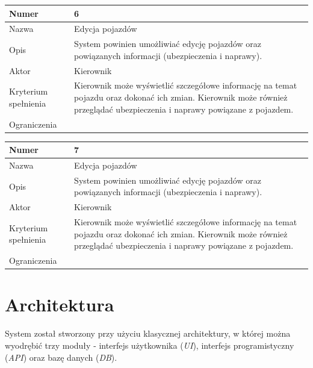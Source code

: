 \documentclass[eng,printmode,openany]{mgr}
\begin{document}
	\begin{table}[H]
		\begin{tabularx}{\textwidth}{|l|X|}
			\hline
			Numer                & 6  \\ \hline
			Nazwa                & Edycja pojazdów \\ \hline
			Opis                 & System powinien umożliwiać edycję pojazdów oraz powiązanych informacji (ubezpieczenia i naprawy). \\ \hline
			Aktor                & Kierownik \\ \hline
			Kryterium spełnienia & Kierownik może wyświetlić szczegółowe informację na temat pojazdu oraz dokonać ich zmian. Kierownik może również przeglądać ubezpieczenia i naprawy powiązane z pojazdem. \\ \hline
			Ograniczenia         &  \\ \hline
		\end{tabularx}
	\end{table}	

	\begin{table}[H]
		\begin{tabularx}{\textwidth}{|l|X|}
			\hline
			Numer                & 7  \\ \hline
			Nazwa                & Edycja pojazdów \\ \hline
			Opis                 & System powinien umożliwiać edycję pojazdów oraz powiązanych informacji (ubezpieczenia i naprawy). \\ \hline
			Aktor                & Kierownik \\ \hline
			Kryterium spełnienia & Kierownik może wyświetlić szczegółowe informację na temat pojazdu oraz dokonać ich zmian. Kierownik może również przeglądać ubezpieczenia i naprawy powiązane z pojazdem. \\ \hline
			Ograniczenia         &  \\ \hline
		\end{tabularx}
	\end{table}	
	\newpage
	\section{Architektura}
	System został stworzony przy użyciu klasycznej architektury, w której można wyodrębić trzy moduły - interfejs użytkownika (\textit{UI}), interfejs programistyczny (\textit{API}) oraz bazę danych (\textit{DB}). 
	
\end{document}
